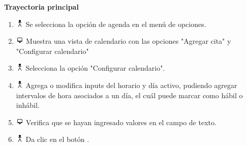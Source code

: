 \textbf{Trayectoria principal}
\begin{enumerate}
\item \includegraphics[height=1em]{pictures/actor.png} Se selecciona la opción de agenda en el menú de opciones.
\item \includegraphics[height=1em]{pictures/sistema.png} Muestra una vista de calendario con las opciones "Agregar cita" y "Configurar calendario"
\item \includegraphics[height=1em]{pictures/actor.png} Selecciona la opción "Configurar calendario".
\item \includegraphics[height=1em]{pictures/actor.png} Agrega o modifica inputs del horario y día activo, pudiendo agregar intervalos de hora asociados a un día, el cuál puede marcar como hábil o inhábil.
\item \includegraphics[height=1em]{pictures/sistema.png} Verifica que se hayan ingresado valores en el campo de texto.
\item \includegraphics[height=1em]{pictures/actor.png} Da clic en el botón .
\end{enumerate} \bigskip



